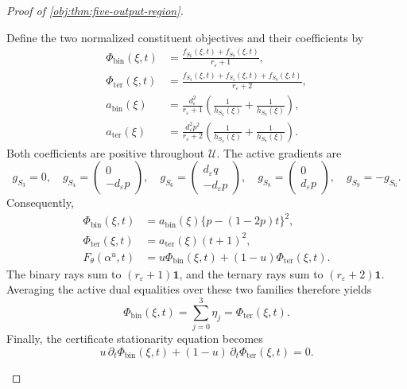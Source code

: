 \begin{proof}[Proof of \cref{obj:thm:five-output-region}]
\begin{enumerate}
Define the two normalized constituent objectives and their coefficients by
\[
\begin{aligned}
\Phi_{\mathrm{bin}}(\xi,t)
&=\frac{f_{S_6}(\xi,t)+f_{S_9}(\xi,t)}{r_\varepsilon+1},\\
\Phi_{\mathrm{ter}}(\xi,t)
&=\frac{f_{S_3}(\xi,t)+f_{S_4}(\xi,t)+f_{S_8}(\xi,t)}
        {r_\varepsilon+2},\\
a_{\mathrm{bin}}(\xi)
&=\frac{d_\varepsilon^2}{r_\varepsilon+1}
  \left(\frac1{h_{S_6}(\xi)}+\frac1{h_{S_9}(\xi)}\right),\\
a_{\mathrm{ter}}(\xi)
&=\frac{d_\varepsilon^2p^2}{r_\varepsilon+2}
  \left(\frac1{h_{S_4}(\xi)}+\frac1{h_{S_8}(\xi)}\right).
\end{aligned}
\]
Both coefficients are positive throughout \(\mathcal U\).
The active gradients are
\[
g_{S_3}=0,\quad
g_{S_4}=\begin{pmatrix}0\\-d_\varepsilon p\end{pmatrix},\quad
g_{S_6}=\begin{pmatrix}d_\varepsilon q\\-d_\varepsilon p\end{pmatrix},\quad
g_{S_8}=\begin{pmatrix}0\\d_\varepsilon p\end{pmatrix},\quad
g_{S_9}=-g_{S_6}.
\]
Consequently,
\[
\begin{aligned}
\Phi_{\mathrm{bin}}(\xi,t)
&=a_{\mathrm{bin}}(\xi)\{p-(1-2p)t\}^2,\\
\Phi_{\mathrm{ter}}(\xi,t)
&=a_{\mathrm{ter}}(\xi)(t+1)^2,\\
F_\theta(\alpha^u,t)
&=u\Phi_{\mathrm{bin}}(\xi,t)+(1-u)\Phi_{\mathrm{ter}}(\xi,t).
\end{aligned}
\]
The binary rays sum to \((r_\varepsilon+1)\mathbf1\), and the ternary rays
sum to \((r_\varepsilon+2)\mathbf1\). Averaging the active dual equalities
over these two families therefore yields
\[
\Phi_{\mathrm{bin}}(\xi,t)
=
\sum_{j=0}^3\eta_j
=
\Phi_{\mathrm{ter}}(\xi,t).
\]
Finally, the certificate stationarity equation becomes
\[
u\,\partial_t\Phi_{\mathrm{bin}}(\xi,t)
+(1-u)\,\partial_t\Phi_{\mathrm{ter}}(\xi,t)=0.
\]


\end{enumerate}
\end{proof}
